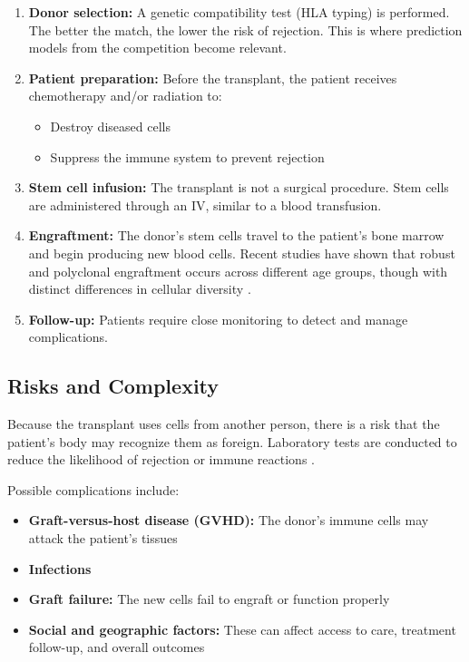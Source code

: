 \begin{enumerate}
    \item \textbf{Donor selection:} A genetic compatibility test (HLA typing) is performed. The better the match, the lower the risk of rejection. This is where prediction models from the competition become relevant.
    
    \item \textbf{Patient preparation:} Before the transplant, the patient receives chemotherapy and/or radiation to:
    \begin{itemize}
        \item Destroy diseased cells
        \item Suppress the immune system to prevent rejection
    \end{itemize}
    
    \item \textbf{Stem cell infusion:} The transplant is not a surgical procedure. Stem cells are administered through an IV, similar to a blood transfusion.
    
    \item \textbf{Engraftment:} The donor's stem cells travel to the patient's bone marrow and begin producing new blood cells. Recent studies have shown that robust and polyclonal engraftment occurs across different age groups, though with distinct differences in cellular diversity \cite{stmcls_clonality}.
    
    \item \textbf{Follow-up:} Patients require close monitoring to detect and manage complications.
\end{enumerate}

\subsection{Risks and Complexity}

Because the transplant uses cells from another person, there is a risk that the patient's body may recognize them as foreign. Laboratory tests are conducted to reduce the likelihood of rejection or immune reactions \cite{uptodate_gvhd}.

Possible complications include:
\begin{itemize}
    \item \textbf{Graft-versus-host disease (GVHD):} The donor's immune cells may attack the patient's tissues \cite{uptodate_gvhd, ash_chronic_gvhd}
    \item \textbf{Infections}
    \item \textbf{Graft failure:} The new cells fail to engraft or function properly
    \item \textbf{Social and geographic factors:} These can affect access to care, treatment follow-up, and overall outcomes \cite{mdpi_cancers}
\end{itemize}


